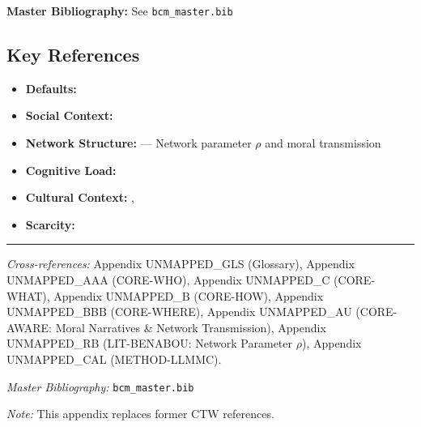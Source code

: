 \begin{tcolorbox}[colback=blue!5!white, colframe=blue!75!black]
\textbf{Master Bibliography:} See \texttt{bcm\_master.bib}
\end{tcolorbox}

\subsection{Key References}

\begin{itemize}[nosep]
\item \textbf{Defaults:} \citet{johnson2003defaults}
\item \textbf{Social Context:} \citet{ariely2009doing}
\item \textbf{Network Structure:} \citet{benabou2018narratives} --- Network parameter $\rho$ and moral transmission
\item \textbf{Cognitive Load:} \citet{kahneman2011thinking}
\item \textbf{Cultural Context:} \citet{wang2017cultural}, \citet{hofstede2010cultures}
\item \textbf{Scarcity:} \citet{mullainathan2013scarcity}
\end{itemize}

\nocite{bcm_master}


\vspace{1em}
\hrule
\vspace{0.5em}

\noindent\textit{Cross-references:}
Appendix UNMAPPED_GLS (Glossary),
Appendix UNMAPPED_AAA (CORE-WHO),
Appendix UNMAPPED_C (CORE-WHAT),
Appendix UNMAPPED_B (CORE-HOW),
Appendix UNMAPPED_BBB (CORE-WHERE),
Appendix UNMAPPED_AU (CORE-AWARE: Moral Narratives \& Network Transmission),
Appendix UNMAPPED_RB (LIT-BENABOU: Network Parameter $\rho$),
Appendix UNMAPPED_CAL (METHOD-LLMMC).

\noindent\textit{Master Bibliography:} \texttt{bcm\_master.bib}

\noindent\textit{Note:} This appendix replaces former CTW references.

